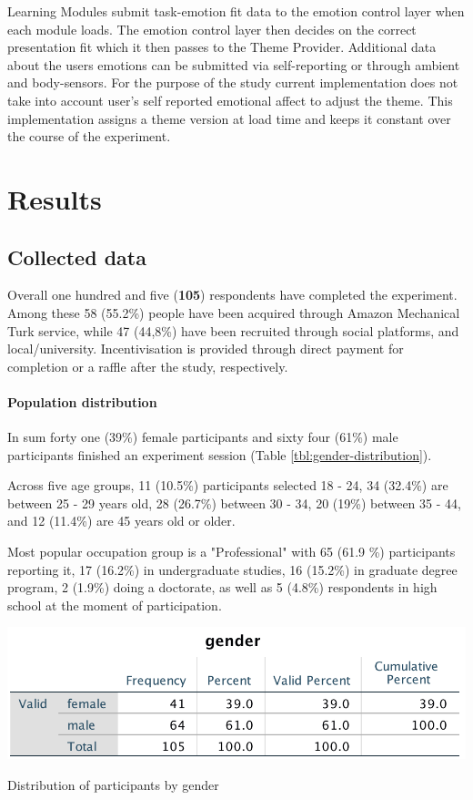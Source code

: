 Learning Modules submit task-emotion fit data to the emotion control layer when each module loads. The emotion control layer then decides on the correct presentation fit which it then passes to the Theme Provider. Additional data about the users emotions can be submitted via self-reporting or through ambient and body-sensors. For the purpose of the study current implementation does not take into account user's self reported emotional affect to adjust the theme. This implementation assigns a theme version at load time and keeps it constant over the course of the experiment.

\section{Results}

	\subsection{Collected data}
	
	Overall one hundred and five (\textbf{105}) respondents have completed the experiment. Among these 58 (55.2\%) people have been acquired through Amazon Mechanical Turk service, while 47 (44,8\%) have been recruited through social platforms, and local/university. Incentivisation is provided through direct payment for completion or a raffle after the study, respectively.
	
	\paragraph{Population distribution}
	
	In sum forty one (39\%) female participants and sixty four (61\%) male participants finished an experiment session (Table \ref{tbl:gender-distribution}).
	 
	Across five age groups, 11 (10.5\%) participants selected 18 - 24, 34 (32.4\%) are between 25 - 29  years old, 28 (26.7\%) between 30 - 34, 20 (19\%) between 35 - 44, and 12 (11.4\%) are 45 years old or older.
	
	Most popular occupation group is a "Professional" with 65 (61.9 \%) participants reporting it, 17 (16.2\%) in undergraduate studies, 16 (15.2\%) in graduate degree program, 2 (1.9\%) doing a doctorate, as well as 5 (4.8\%) respondents in high school at the moment of participation.
	
\begin{table}[h!]
	\centering
	\includegraphics[width=0.7\linewidth]{graphics/Gender-distribution}
	\caption{Distribution of participants by gender}
	\label{tbl:gender-distribution}
\end{table}
	
